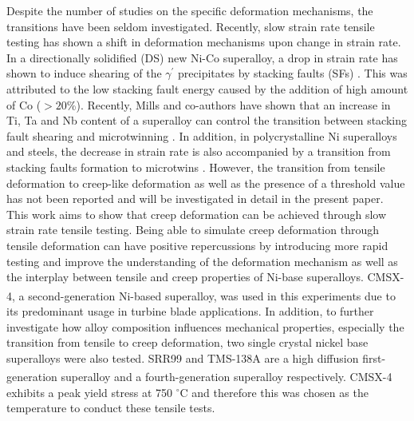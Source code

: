 \documentclass[a4paper,12pt,times,numbered,print,index]{Classes/PhDThesisPSnPDF}
\begin{document}
Despite the number of studies on the specific deformation mechanisms, the transitions have been seldom investigated. Recently, slow strain rate tensile testing has shown a shift in deformation mechanisms upon change in strain rate. In a directionally solidified (DS) new Ni-Co superalloy, a drop in strain rate has shown to induce shearing of the $\gamma^{\prime}$ precipitates by stacking faults (SFs) \cite{Cui2011}. This was attributed to the low stacking fault energy caused by the addition of high amount of Co ($>20$\%). Recently, Mills  and co-authors have shown that an increase in Ti, Ta and Nb content of a superalloy can control the transition between stacking fault shearing and microtwinning \cite{}. In addition, in polycrystalline Ni superalloys and steels, the decrease in strain rate is also accompanied by a transition from stacking faults formation to microtwins \cite{}. %
However, the transition from tensile deformation to creep-like deformation as well as the presence of a threshold value has not been reported and will be investigated in detail in the present paper. %
This work aims to show that creep deformation can be achieved through slow strain rate tensile testing. Being able to simulate creep deformation through tensile deformation can have positive repercussions by introducing more rapid testing and improve the understanding of the deformation mechanism as well as the interplay between tensile and creep properties of Ni-base superalloys.
CMSX-4\textsuperscript{\textregistered}, a second-generation Ni-based superalloy, was used in this experiments due to its predominant usage in turbine blade applications. In addition, to further investigate how alloy composition influences mechanical properties, especially the transition from tensile to creep deformation, two single crystal nickel base superalloys were also tested.
SRR99 and TMS-138A are a high diffusion first-generation superalloy and a fourth-generation superalloy respectively. CMSX-4\textsuperscript{\textregistered} exhibits a peak yield stress at 750 $^\circ{}$C and therefore this was chosen as the temperature to conduct these tensile tests.
\end{document}
